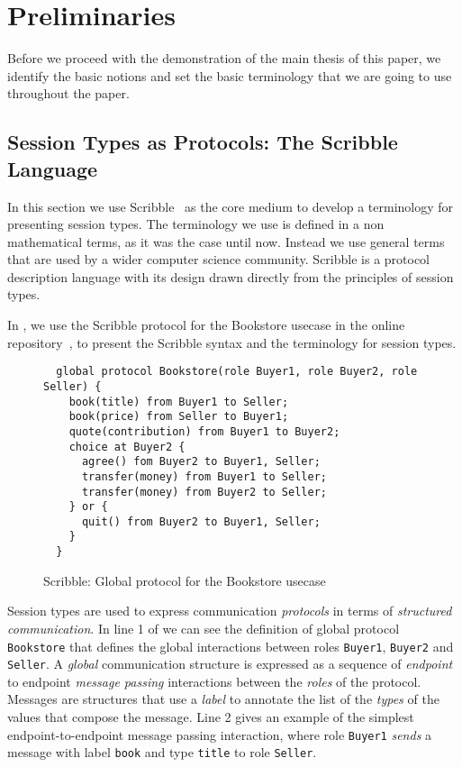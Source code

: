 \section{Preliminaries}

Before we proceed with the demonstration of the main thesis
of this paper, we identify the basic notions and set the basic
terminology that we are going to use throughout the paper.

\subsection{Session Types as Protocols: The Scribble Language}

In this section we use Scribble~\cite{scribble} as the core
medium to develop a terminology for presenting session types.
The terminology we use is defined in a non mathematical terms,
as it was the case until now. Instead we use general terms
that are used by a wider computer science community.
Scribble is a protocol description language with its design
drawn directly from the principles of session types.

In , we use the Scribble protocol for the
Bookstore usecase in the online repository~\cite{usecase_repository},
to present the Scribble syntax and the terminology for session types.


\begin{figure}[t]
\begin{lstlisting}
  global protocol Bookstore(role Buyer1, role Buyer2, role Seller) {
    book(title) from Buyer1 to Seller;
    book(price) from Seller to Buyer1;
    quote(contribution) from Buyer1 to Buyer2;
    choice at Buyer2 {
      agree() fom Buyer2 to Buyer1, Seller;
      transfer(money) from Buyer1 to Seller;
      transfer(money) from Buyer2 to Seller;
    } or {
      quit() from Buyer2 to Buyer1, Seller;
    }
  }
\end{lstlisting}
\caption{Scribble: Global protocol for the Bookstore usecase}
\label{fig:scribble_bs}
\end{figure}

Session types are used to express communication
{\em protocols} in terms of {\em structured communication}.
In line 1 of  we can see the definition 
of global protocol \lstinline|Bookstore| that defines 
the global interactions between roles \lstinline|Buyer1|,
\lstinline|Buyer2| and \lstinline|Seller|.
A {\em global} communication structure is expressed 
as a sequence of {\em endpoint} to endpoint {\em message passing}
interactions between the {\em roles} of the protocol. Messages
are structures that use a {\em label} to annotate the list
of the {\em types} of the values that compose the message.
Line 2 gives an example of the simplest endpoint-to-endpoint message
passing interaction,
where role \lstinline|Buyer1| {\em sends} a message with
label \lstinline|book| and type \lstinline|title| to role
\lstinline{Seller}.


